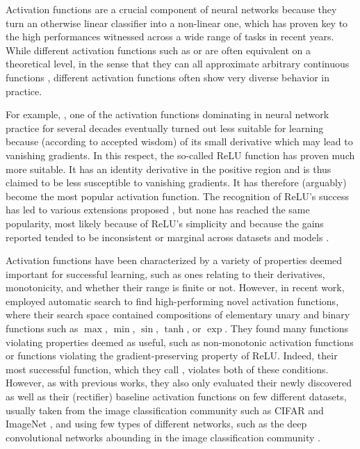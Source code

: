Activation functions are a crucial component of neural networks
because they turn an otherwise linear classifier into a non-linear one, which has proven key to the high performances witnessed across a wide range of tasks in recent years. While different activation functions such as \sigmoid{} or \mytanh{} are often equivalent on a theoretical level, in the sense that they can all approximate arbitrary continuous functions \cite{Hornik:1991}, different activation functions often show very diverse behavior in practice.

For example, \sigmoid{}, one of the activation functions dominating in neural network practice for several decades
eventually turned out less suitable for learning because (according to accepted wisdom) of its small derivative which may lead to vanishing gradients. 
In this respect, the so-called ReLU function \cite{Glorot:2011} has proven much more suitable.
It has an identity derivative in the positive region and is thus claimed to be less susceptible to vanishing gradients. It has therefore (arguably) become the most popular activation function. The recognition of ReLU's success has led to various extensions proposed \cite{Maas:2013,He:2015,Klambauer:2017}, but none has reached the same popularity, most likely because of ReLU's simplicity and because the gains reported tended to be inconsistent or marginal across datasets and models \cite{Ramach:2018}.

Activation functions have been characterized by a variety of properties deemed important for successful learning, such as ones %
relating to their derivatives, monotonicity, and whether their range is finite or not. However, in recent work, \citet{Ramach:2018} employed automatic search to find high-performing novel activation functions, where their search space contained compositions of elementary unary and binary functions such as $\max$, $\min$, $\sin$, $\tanh$, or $\exp$. They found many functions violating properties deemed as useful, such as non-monotonic activation functions or functions violating the gradient-preserving property of ReLU. Indeed, their most successful function, which they call \swish{}, violates both of these conditions. However, as with previous works, they also only evaluated their newly discovered as well as their (rectifier) baseline activation functions on few different datasets, usually taken from the image classification community such as CIFAR \cite{Krizhevsky:2009} and ImageNet \cite{Russakovsky:2015}, and using few types of different networks, such as the deep convolutional networks abounding in the image classification community \cite{Szegedy:2016}.

